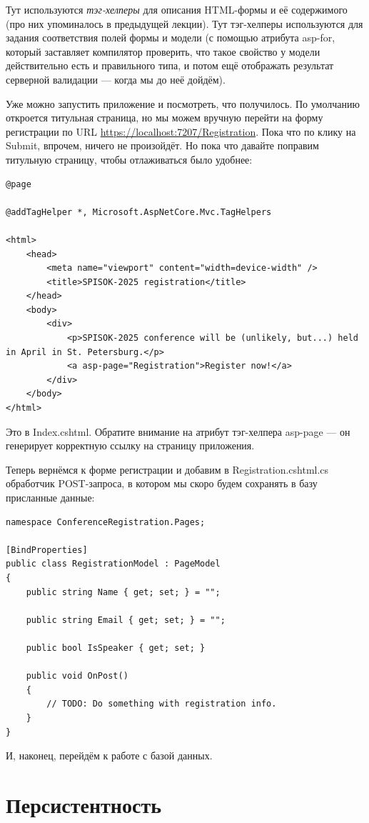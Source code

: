 \documentclass{../../text-style}
\begin{document}
Тут используются \emph{тэг-хелперы} для описания HTML-формы и её содержимого (про них упоминалось в предыдущей лекции). Тут тэг-хелперы используются для задания соответствия полей формы и модели (с помощью атрибута asp-for, который заставляет компилятор проверить, что такое свойство у модели действительно есть и правильного типа, и потом ещё отображать результат серверной валидации --- когда мы до неё дойдём).

Уже можно запустить приложение и посмотреть, что получилось. По умолчанию откроется титульная страница, но мы можем вручную перейти на форму регистрации по URL \url{https://localhost:7207/Registration}. Пока что по клику на Submit, впрочем, ничего не произойдёт. Но пока что давайте поправим титульную страницу, чтобы отлаживаться было удобнее:

\begin{verbatim}
@page

@addTagHelper *, Microsoft.AspNetCore.Mvc.TagHelpers

<html>
    <head>
        <meta name="viewport" content="width=device-width" />
        <title>SPISOK-2025 registration</title>
    </head>
    <body>
        <div>
            <p>SPISOK-2025 conference will be (unlikely, but...) held in April in St. Petersburg.</p>
            <a asp-page="Registration">Register now!</a>
        </div>
    </body>
</html>
\end{verbatim}

Это в Index.cshtml. Обратите внимание на атрибут тэг-хелпера asp-page --- он генерирует корректную ссылку на страницу приложения.

Теперь вернёмся к форме регистрации и добавим в Registration.cshtml.cs обработчик POST-запроса, в котором мы скоро будем сохранять в базу присланные данные:

\begin{verbatim}
namespace ConferenceRegistration.Pages;

[BindProperties]
public class RegistrationModel : PageModel
{
    public string Name { get; set; } = "";

    public string Email { get; set; } = "";

    public bool IsSpeaker { get; set; }

    public void OnPost()
    {
        // TODO: Do something with registration info.
    }
}
\end{verbatim}

И, наконец, перейдём к работе с базой данных.

\section{Персистентность}
\end{document}
